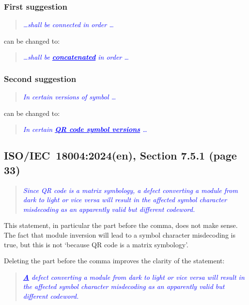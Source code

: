 \documentclass[a4paper,twoside]{article}
\newcommand{\shortstandard}{ISO/IEC~18004}
\newcommand{\standard}{\shortstandard:2024(en)}
\newcommand{\quotestandard}[1]{\textcolor{blue}{\textit{#1}}}
\newcommand{\ddd}{\dots}
\newcommand{\change}[1]{\underline{\textbf{#1}}}
\begin{document}
\subsubsection*{First suggestion}

\begin{quote}
\quotestandard{\ddd shall be connected in order \ddd}
\end{quote}

can be changed to:

\begin{quote}
\quotestandard{\ddd shall be \change{concatenated} in order \ddd}
\end{quote}

\subsubsection*{Second suggestion}

\begin{quote}
\quotestandard{In certain versions of symbol \ddd}
\end{quote}

can be changed to:

\begin{quote}
\quotestandard{In certain \change{QR code symbol versions} \ddd}
\end{quote}

\subsection{\standard, Section 7.5.1 (page 33)}

\begin{quote}
\quotestandard{Since QR code is a matrix symbology, a defect converting a module from dark to light or vice versa
will result in the affected symbol character misdecoding as an apparently valid but different codeword.}
\end{quote}

This statement, in particular the part before the comma, does not make sense. The fact that module
inversion will lead to a symbol character misdecoding is true, but this is not `because QR code is a
matrix symbology'.

Deleting the part before the comma improves the clarity of the statement:

\begin{quote}
\quotestandard{\change{A} defect converting a module from dark to light or vice versa will result in the affected symbol
character misdecoding as an apparently valid but different codeword.}
\end{quote}
\end{document}
